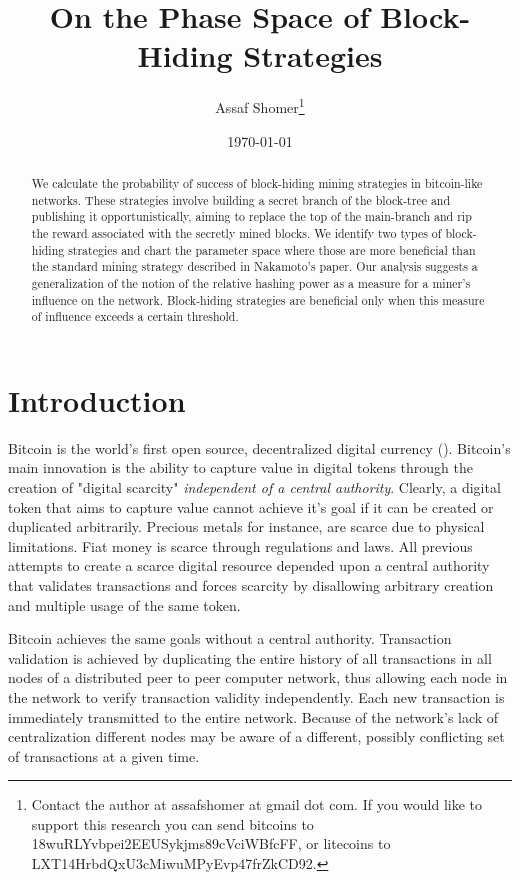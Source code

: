 \documentclass[letterpaper,12pt]{report}
\title{\textbf{On the Phase Space of Block-Hiding Strategies}}
\author{Assaf Shomer\footnote{Contact the author at assafshomer at gmail dot com. If you would like to support this research you can send bitcoins to 18wuRLYvbpei2EEUSykjms89cVciWBfcFF, or litecoins to LXT14HrbdQxU3cMiwuMPyEvp47frZkCD92.}\\
}
\date{\today}
\begin{document}
\maketitle

\begin{abstract}
We calculate the probability of success of block-hiding mining strategies in bitcoin-like networks.
These strategies involve building a secret branch of the block-tree and publishing it opportunistically, aiming to replace the top of the main-branch and rip the reward associated with the secretly mined blocks. We identify two types of block-hiding strategies and chart the parameter space where those are more beneficial than the standard mining strategy described in Nakamoto's paper.
Our analysis suggests a generalization of the notion of the relative hashing power as a measure for a miner's influence on the network. Block-hiding strategies are beneficial only when this measure of influence exceeds a certain threshold.


\end{abstract}
\tableofcontents
\chapter{Introduction}\label{chap:intro}
Bitcoin is the world's first open source, decentralized digital currency (\cite{Bitcoin}). Bitcoin's main innovation is the ability to capture value in digital tokens through the creation of "digital scarcity" \textit{independent of a central authority}. Clearly, a digital token that aims to capture value cannot achieve it's goal if it can be created or duplicated arbitrarily. Precious metals for instance, are scarce due to physical limitations. Fiat money is scarce through regulations and laws. All previous attempts to create a scarce digital resource depended upon a central authority that validates transactions and forces scarcity by disallowing arbitrary creation and multiple usage of the same token. 

Bitcoin achieves the same goals without a central authority. Transaction validation is achieved by duplicating the entire history of all transactions in all nodes of a distributed peer to peer computer network, thus allowing each node in the network to verify transaction validity independently. Each new transaction is immediately transmitted to the entire network. Because of the network's lack of centralization different nodes may be aware of a different, possibly conflicting set of transactions at a given time. 
\end{document}
